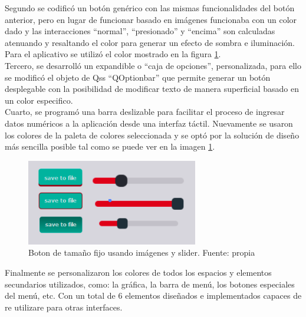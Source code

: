Segundo se codificó un botón genérico con las mismas funcionalidades del botón anterior, pero en lugar de funcionar basado en imágenes funcionaba con un color dado y las interacciones ``normal'', ``presionado'' y ``encima'' son calculadas atenuando y resaltando el color para generar un efecto de sombra e iluminación. Para el aplicativo se utilizó el color mostrado en la figura \ref{fig_20}.
\vspace{0.5cm}\\
Tercero, se desarrolló un expandible o ``caja de opciones'', personalizada, para ello se modificó el objeto de Qss “QOptionbar” que permite generar un botón desplegable con la posibilidad de modificar texto de manera superficial basado en un color especifico.
\vspace{0.5cm}\\
Cuarto, se programó una barra deslizable para facilitar el proceso de ingresar datos numéricos a la aplicación desde una interfaz táctil. Nuevamente se usaron los colores de la paleta de colores seleccionada y se optó por la solución de diseño más sencilla posible tal como se puede ver en la imagen \ref{fig_20}.

\begin{figure}[htbp]
	\centerline{\includegraphics[width=7.5cm]{./figuras/qt_button_slide.png}}
	\caption{Boton de tamaño fijo usando imágenes y slider. Fuente: propia}
	\label{fig_20}
\end{figure}

Finalmente se personalizaron los colores de todos los espacios y elementos secundarios utilizados, como: la gráfica, la barra de menú, los botones especiales del menú, etc. Con un total de 6 elementos diseñados e implementados capaces de re utilizare para otras interfaces.



